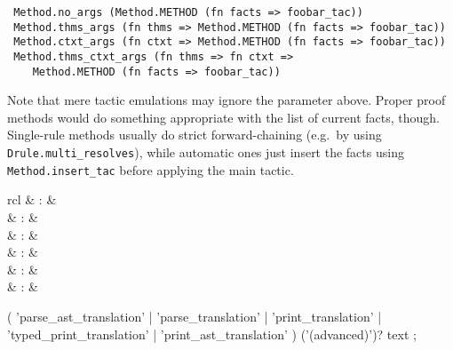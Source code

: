 \begin{isabellebody}
\begin{isamarkuptext}
\begin{descr}
{\footnotesize
\begin{verbatim}
 Method.no_args (Method.METHOD (fn facts => foobar_tac))
 Method.thms_args (fn thms => Method.METHOD (fn facts => foobar_tac))
 Method.ctxt_args (fn ctxt => Method.METHOD (fn facts => foobar_tac))
 Method.thms_ctxt_args (fn thms => fn ctxt =>
    Method.METHOD (fn facts => foobar_tac))
\end{verbatim}
}

  Note that mere tactic emulations may ignore the 
  parameter above.  Proper proof methods would do something
  appropriate with the list of current facts, though.  Single-rule
  methods usually do strict forward-chaining (e.g.\ by using \verb|Drule.multi_resolves|), while automatic ones just insert the facts
  using \verb|Method.insert_tac| before applying the main tactic.

  \end{descr}%
\end{isamarkuptext}%
\isamarkuptrue%
%
\isamarkuptrue%
%
\begin{isamarkuptext}%
\begin{matharray}{rcl}
    \mbox{} & : &  \\
    \mbox{} & : &  \\
    \mbox{} & : &  \\
    \mbox{} & : &  \\
    \mbox{} & : &  \\
    \mbox{} & : &  \\
  \end{matharray}

  \begin{rail}
  ( 'parse\_ast\_translation' | 'parse\_translation' | 'print\_translation' |
    'typed\_print\_translation' | 'print\_ast\_translation' ) ('(advanced)')? text
  ;


\end{rail}
\end{isamarkuptext}
\end{isabellebody}
